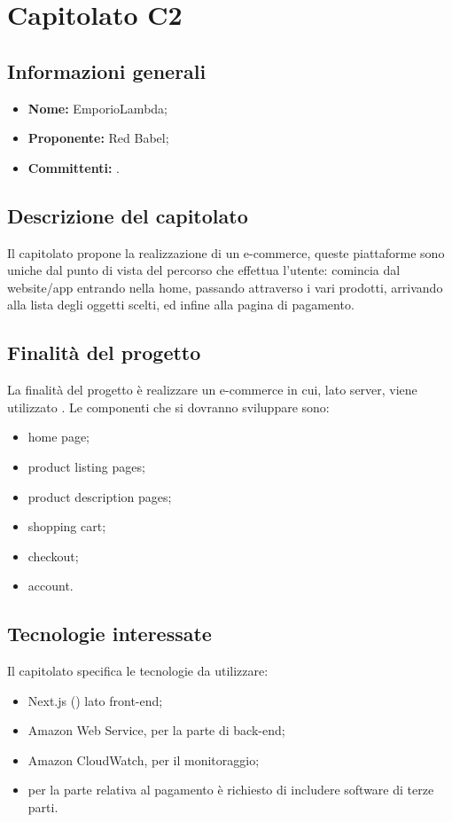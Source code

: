 \section{Capitolato C2}

\subsection{Informazioni generali}
\begin{itemize}
\item \textbf{Nome:} EmporioLambda;
\item \textbf{Proponente:} Red Babel;
\item \textbf{Committenti:} \committenti{}.
\end{itemize}

\subsection{Descrizione del capitolato}
Il capitolato propone la realizzazione di un e-commerce, queste piattaforme sono uniche dal punto di vista del percorso che effettua l'utente: comincia dal website/app entrando nella home, passando attraverso i vari prodotti, arrivando alla lista degli oggetti scelti, ed infine alla pagina di pagamento. 

\subsection{Finalità del progetto}
La finalità del progetto è realizzare un e-commerce in cui, lato server, viene utilizzato . Le componenti che si dovranno sviluppare sono:
\begin{itemize}
\item home page;
\item product listing pages;
\item product description pages;
\item shopping cart;
\item checkout;
\item account.
\end{itemize}

\subsection{Tecnologie interessate}
Il capitolato specifica le tecnologie da utilizzare:
\begin{itemize}
\item Next.js () lato front-end;
\item Amazon Web Service, per la parte di back-end;
\item Amazon CloudWatch, per il monitoraggio;
\item per la parte relativa al pagamento è richiesto di includere software di terze parti.
\end{itemize}


